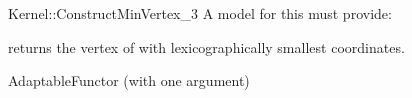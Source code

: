 \begin{ccRefFunctionObjectConcept}{Kernel::ConstructMinVertex_3}
A model for this must provide:




 {returns the vertex of
   with lexicographically smallest coordinates.}


\ccRefines
AdaptableFunctor (with one argument)

\ccSeeAlso
{}

\end{ccRefFunctionObjectConcept}
